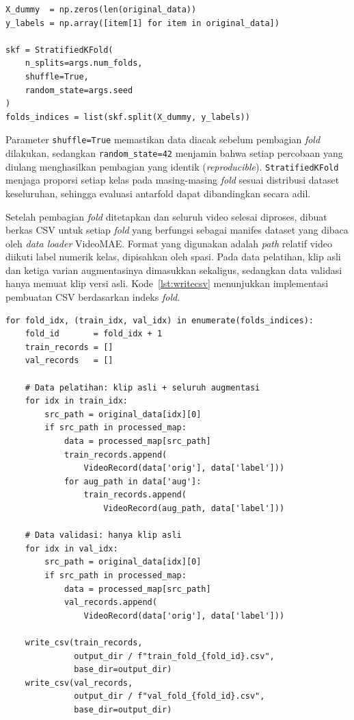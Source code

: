 \begin{lstlisting}[caption={Kode pembagian dataset dengan \textit{Stratified K-Fold}}, label={lst:kfold}]
X_dummy  = np.zeros(len(original_data))
y_labels = np.array([item[1] for item in original_data])

skf = StratifiedKFold(
    n_splits=args.num_folds,
    shuffle=True,
    random_state=args.seed
)
folds_indices = list(skf.split(X_dummy, y_labels))
\end{lstlisting}

Parameter \texttt{shuffle=True} memastikan data diacak sebelum pembagian \textit{fold} dilakukan, sedangkan \texttt{random\_state=42} menjamin bahwa setiap percobaan yang diulang menghasilkan pembagian yang identik (\textit{reproducible}). \texttt{StratifiedKFold} menjaga proporsi setiap kelas pada masing-masing \textit{fold} sesuai distribusi dataset keseluruhan, sehingga evaluasi antarfold dapat dibandingkan secara adil.\par

Setelah pembagian \textit{fold} ditetapkan dan seluruh video selesai diproses, dibuat berkas CSV untuk setiap \textit{fold} yang berfungsi sebagai manifes dataset yang dibaca oleh \textit{data loader} VideoMAE. Format yang digunakan adalah \textit{path} relatif video diikuti label numerik kelas, dipisahkan oleh spasi. Pada data pelatihan, klip asli dan ketiga varian augmentasinya dimasukkan sekaligus, sedangkan data validasi hanya memuat klip versi asli. Kode~\ref{lst:writecsv} menunjukkan implementasi pembuatan CSV berdasarkan indeks \textit{fold}.\par

\begin{lstlisting}[caption={Kode penulisan berkas CSV untuk setiap \textit{fold}}, label={lst:writecsv}]
for fold_idx, (train_idx, val_idx) in enumerate(folds_indices):
    fold_id       = fold_idx + 1
    train_records = []
    val_records   = []

    # Data pelatihan: klip asli + seluruh augmentasi
    for idx in train_idx:
        src_path = original_data[idx][0]
        if src_path in processed_map:
            data = processed_map[src_path]
            train_records.append(
                VideoRecord(data['orig'], data['label']))
            for aug_path in data['aug']:
                train_records.append(
                    VideoRecord(aug_path, data['label']))

    # Data validasi: hanya klip asli
    for idx in val_idx:
        src_path = original_data[idx][0]
        if src_path in processed_map:
            data = processed_map[src_path]
            val_records.append(
                VideoRecord(data['orig'], data['label']))

    write_csv(train_records,
              output_dir / f"train_fold_{fold_id}.csv",
              base_dir=output_dir)
    write_csv(val_records,
              output_dir / f"val_fold_{fold_id}.csv",
              base_dir=output_dir)
\end{lstlisting}

